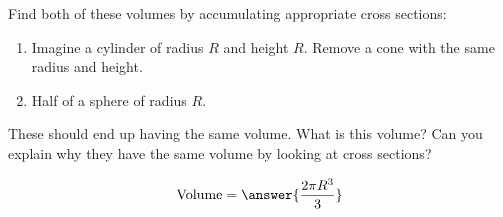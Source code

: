 \documentclass{ximera}
\author{Steven Gubkin}
\begin{document}
\begin{exercise}



Find both of these volumes by accumulating appropriate cross sections:
\begin{enumerate}
  \item Imagine a cylinder of radius $R$ and height $R$.  Remove a
    cone with the same radius and height.
  \item Half of a sphere of radius $R$.
\end{enumerate}
These should end up having the same volume.  What is this volume? Can
you explain why they have the same volume by looking at cross
sections?
\begin{prompt}
	\[
	\textrm{Volume} = \answer{\frac{2\pi R^3}{3}}
	\]
\end{prompt}
\end{exercise}
\end{document}
